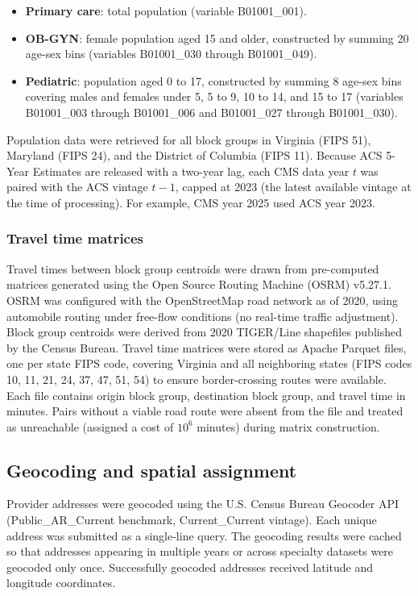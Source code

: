 \documentclass{CUP-JNL-DAP}%
\begin{document}
\begin{itemize}
\item \textbf{Primary care}: total population (variable B01001\_001).
\item \textbf{OB-GYN}: female population aged 15 and older, constructed by summing 20 age-sex bins (variables B01001\_030 through B01001\_049).
\item \textbf{Pediatric}: population aged 0 to 17, constructed by summing 8 age-sex bins covering males and females under 5, 5 to 9, 10 to 14, and 15 to 17 (variables B01001\_003 through B01001\_006 and B01001\_027 through B01001\_030).
\end{itemize}

Population data were retrieved for all block groups in Virginia (FIPS 51), Maryland (FIPS 24), and the District of Columbia (FIPS 11). Because ACS 5-Year Estimates are released with a two-year lag, each CMS data year $t$ was paired with the ACS vintage $t - 1$, capped at 2023 (the latest available vintage at the time of processing). For example, CMS year 2025 used ACS year 2023.

\subsubsection{Travel time matrices}

Travel times between block group centroids were drawn from pre-computed matrices generated using the Open Source Routing Machine (OSRM) v5.27.1. OSRM was configured with the OpenStreetMap road network as of 2020, using automobile routing under free-flow conditions (no real-time traffic adjustment). Block group centroids were derived from 2020 TIGER/Line shapefiles published by the Census Bureau. Travel time matrices were stored as Apache Parquet files, one per state FIPS code, covering Virginia and all neighboring states (FIPS codes 10, 11, 21, 24, 37, 47, 51, 54) to ensure border-crossing routes were available. Each file contains origin block group, destination block group, and travel time in minutes. Pairs without a viable road route were absent from the file and treated as unreachable (assigned a cost of $10^{6}$ minutes) during matrix construction.

\subsection{Geocoding and spatial assignment}

Provider addresses were geocoded using the U.S. Census Bureau Geocoder API (Public\_AR\_Current benchmark, Current\_Current vintage). Each unique address was submitted as a single-line query. The geocoding results were cached so that addresses appearing in multiple years or across specialty datasets were geocoded only once. Successfully geocoded addresses received latitude and longitude coordinates.
\end{document}
